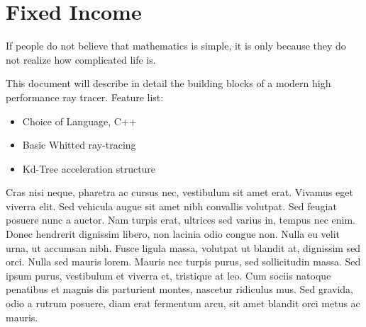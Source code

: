 \chapter{Fixed Income}
 \begin{fquote}If people do not believe that mathematics is simple, it is only because they do not realize how complicated life is.
 \end{fquote}

This document will describe in detail the building blocks of a modern high performance ray tracer.
Feature list:
\begin{itemize}
\item Choice of Language, C++
\item Basic Whitted ray-tracing
\item Kd-Tree acceleration structure
\end{itemize}
Cras nisi neque, pharetra ac cursus nec, vestibulum sit amet erat. Vivamus eget viverra elit. Sed vehicula augue sit amet nibh convallis volutpat. Sed feugiat posuere nunc a auctor. Nam turpis erat, ultrices sed varius in, tempus nec enim. Donec hendrerit dignissim libero, non lacinia odio congue non. Nulla eu velit urna, ut accumsan nibh. Fusce ligula massa, volutpat ut blandit at, dignissim sed orci. Nulla sed mauris lorem. Mauris nec turpis purus, sed sollicitudin massa. Sed ipsum purus, vestibulum et viverra et, tristique at leo. Cum sociis natoque penatibus et magnis dis parturient montes, nascetur ridiculus mus. Sed gravida, odio a rutrum posuere, diam erat fermentum arcu, sit amet blandit orci metus ac mauris.
